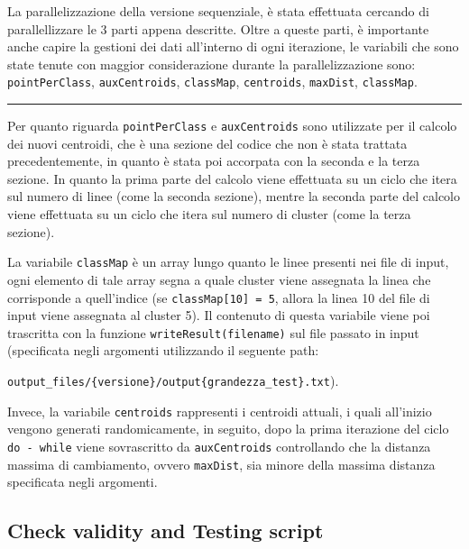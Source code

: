 \documentclass{article}
\begin{document}
  La parallelizzazione della versione sequenziale, è stata effettuata cercando di parallellizzare le 3 parti appena descritte.
  Oltre a queste parti, è importante anche capire la gestioni dei dati all'interno di ogni iterazione, le variabili 
  che sono state tenute con maggior considerazione durante la parallelizzazione sono: \verb|pointPerClass|, \verb|auxCentroids|,
  \verb|classMap|, \verb|centroids|, \verb|maxDist|, \verb|classMap|.
  \begin{center}
    \rule{6cm}{1pt}
  \end{center}
  Per quanto riguarda \verb|pointPerClass| e \verb|auxCentroids| sono utilizzate per il calcolo dei nuovi centroidi, che è una sezione 
  del codice che non è stata trattata precedentemente, in quanto è stata poi accorpata con la seconda e la terza sezione. In quanto la prima parte 
  del calcolo viene effettuata su un ciclo che itera sul numero di linee (come la seconda sezione), mentre la seconda parte del calcolo viene effettuata 
  su un ciclo che itera sul numero di cluster (come la terza sezione).
  
  La variabile \verb|classMap| è un array lungo quanto le linee presenti nei file di input, ogni elemento di tale array segna a quale cluster viene assegnata 
  la linea che corrisponde a quell'indice (se \verb|classMap[10] = 5|, allora la linea 10 del file di input viene assegnata al cluster 5). Il contenuto di questa variabile 
  viene poi trascritta con la funzione \verb|writeResult(filename)| sul file passato in input (specificata negli argomenti utilizzando il seguente path:
  \begin{center}
    \verb|output_files/{versione}/output{grandezza_test}.txt|).
  \end{center}
  Invece, la variabile \verb|centroids| rappresenti i centroidi attuali, i quali all'inizio vengono generati randomicamente, in seguito, dopo la prima iterazione del ciclo
  \verb|do - while| viene sovrascritto da \verb|auxCentroids| controllando che la distanza massima di cambiamento, ovvero \verb|maxDist|, sia minore della massima distanza specificata
  negli argomenti.

  \subsection{Check validity and Testing script}
\end{document}
